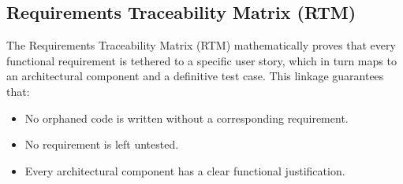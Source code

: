 \subsection{Requirements Traceability Matrix (RTM)}
The Requirements Traceability Matrix (RTM) mathematically proves that every functional requirement is tethered to a specific user story, which in turn maps to an architectural component and a definitive test case. This linkage guarantees that:

\begin{itemize}
    \item No orphaned code is written without a corresponding requirement.
    \item No requirement is left untested.
    \item Every architectural component has a clear functional justification.
\end{itemize}

\vspace{1em}

